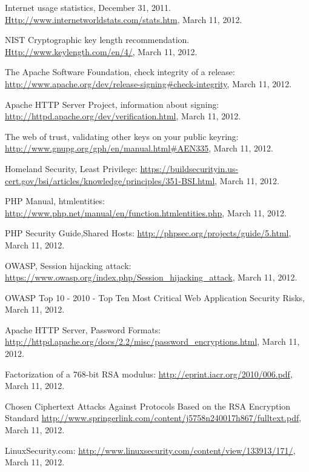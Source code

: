 \documentclass[a4paper, 12pt]{article}
\begin{document}
\begin{thebibliography}{10}
 Internet usage statistics, December 31, 2011. \url{Http://www.internetworldstats.com/stats.htm}, March 11, 2012.

 NIST Cryptographic key length recommendation. \url{Http://www.keylength.com/en/4/}, March 11, 2012.

 The Apache Software Foundation, check integrity of a release: \url{http://www.apache.org/dev/release-signing\#check-integrity}, March 11, 2012.

Apache HTTP Server Project, information about signing: \url{http://httpd.apache.org/dev/verification.html}, March 11, 2012.

The web of trust, validating other keys on your public keyring: \url{http://www.gnupg.org/gph/en/manual.html#AEN335}, March 11, 2012.

Homeland Security, Least Privilege: \url{https://buildsecurityin.us-cert.gov/bsi/articles/knowledge/principles/351-BSI.html}, March 11, 2012.

PHP Manual, htmlentities: \url{http://www.php.net/manual/en/function.htmlentities.php}, March 11, 2012.

PHP Security Guide,Shared Hosts: \url{http://phpsec.org/projects/guide/5.html}, March 11, 2012.

OWASP, Session hijacking attack: \url{https://www.owasp.org/index.php/Session_hijacking_attack}, March 11, 2012.

OWASP Top 10 - 2010 - Top Ten Most Critical Web Application Security Risks, March 11, 2012.

Apache HTTP Server, Password Formats:  \url{http://httpd.apache.org/docs/2.2/misc/password_encryptions.html}, March 11, 2012.

Factorization of a 768-bit RSA modulus: \url{http://eprint.iacr.org/2010/006.pdf}, March 11, 2012.

Chosen Ciphertext Attacks Against Protocols Based on the RSA Encryption Standard \url{http://www.springerlink.com/content/j5758n240017h867/fulltext.pdf}, March 11, 2012.

LinuxSecurity.com: \url{http://www.linuxsecurity.com/content/view/133913/171/}, March 11, 2012.

\end{thebibliography}
\end{document}
